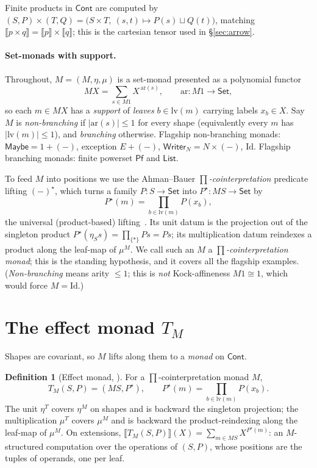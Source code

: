 \documentclass[11pt]{article}
\theoremstyle{plain}
\theoremstyle{definition}
\newtheorem{definition}[theorem]{Definition}
\theoremstyle{remark}
\newcommand{\Set}{\mathsf{Set}}
\newcommand{\Cont}{\mathsf{Cont}}
\newcommand{\lv}{\mathrm{lv}}
\newcommand{\ar}{\mathrm{ar}}
\newcommand{\Ext}[1]{\llbracket #1\rrbracket}
\newcommand{\cont}[2]{(#1,#2)}
\newcommand{\Maybe}{\mathsf{Maybe}}
\newcommand{\Pf}{\mathsf{Pf}}
\newcommand{\Writer}{\mathsf{Writer}}
\newcommand{\List}{\mathsf{List}}
\begin{document}
Finite products in $\Cont$ are computed by
$\cont S P\times\cont T Q=\bigl(S\times T,\ (s,t)\mapsto P(s)\sqcup Q(t)\bigr)$,
matching $\Ext{p\times q}=\Ext p\times\Ext q$; this is the cartesian tensor used in
\S\ref{sec:arrow}.

\paragraph{Set-monads with support.}
Throughout, $M=(M,\eta,\mu)$ is a set-monad presented as a polynomial functor
\[
  MX=\sum_{s\in M1}X^{\,\ar(s)},\qquad \ar\colon M1\to\Set,
\]
so each $m\in MX$ has a \emph{support} of \emph{leaves} $b\in\lv(m)$ carrying labels
$x_b\in X$. Say $M$ is \emph{non-branching} if $|\ar(s)|\le1$ for every shape
(equivalently every $m$ has $|\lv(m)|\le1$), and \emph{branching} otherwise. Flagship
non-branching monads: $\Maybe=1+(-)$, exception $E+(-)$, $\Writer_N=N\times(-)$,
$\mathrm{Id}$. Flagship branching monads: finite powerset $\Pf$ and $\List$.

To feed $M$ into positions we use the Ahman--Bauer \emph{$\prod$-cointerpretation}
predicate lifting $(-)^\star$, which turns a family $P\colon S\to\Set$ into
$P^\star\colon MS\to\Set$ by
\[
  P^\star(m)=\prod_{b\in\lv(m)}P(x_b),
\]
the universal (product-based) lifting~\cite[\S6]{AhmanBauer24}. Its unit datum is the
projection out of the singleton product $P^\star(\eta_S s)=\prod_{\{*\}}Ps=Ps$; its
multiplication datum reindexes a product along the leaf-map of $\mu^M$. We call such an
$M$ a \emph{$\prod$-cointerpretation monad}; this is the standing hypothesis, and it
covers all the flagship examples. (\emph{Non-branching} means arity $\le1$; this is
\emph{not} Kock-affineness $M1\cong1$, which would force $M=\mathrm{Id}$.)

\section{The effect monad $T_M$}\label{sec:effect}

Shapes are covariant, so $M$ lifts along them to a \emph{monad} on $\Cont$.

\begin{definition}[Effect monad, {\cite[Thm.~6.3]{AhmanBauer24}}]\label{def:T}
For a $\prod$-cointerpretation monad $M$,
\[
  T_M\cont S P=\cont{MS}{P^\star},\qquad P^\star(m)=\prod_{b\in\lv(m)}P(x_b).
\]
The unit $\eta^T$ covers $\eta^M$ on shapes and is backward the singleton projection;
the multiplication $\mu^T$ covers $\mu^M$ and is backward the product-reindexing along
the leaf-map of $\mu^M$. On extensions,
$\Ext{T_M(S,P)}(X)=\sum_{m\in MS}X^{P^\star(m)}$: an $M$-structured computation over the
operations of $\cont S P$, whose positions are the tuples of operands, one per leaf.
\end{definition}
\end{document}
